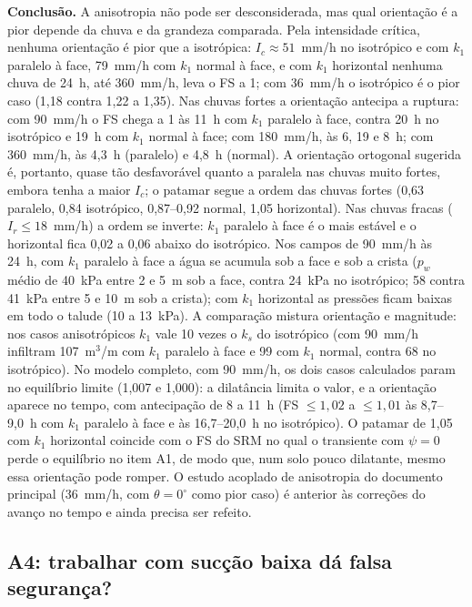 \textbf{Conclus\~ao.} A anisotropia n\~ao pode ser desconsiderada, mas qual orienta\c{c}\~ao \'e a pior depende da chuva
e da grandeza comparada. Pela intensidade cr\'itica, nenhuma orienta\c{c}\~ao \'e pior que a isotr\'opica: $I_c\approx51$~mm/h
no isotr\'opico e com $k_1$ paralelo \`a face, 79~mm/h com $k_1$ normal \`a face, e com $k_1$ horizontal nenhuma chuva de
24~h, at\'e 360~mm/h, leva o FS a 1; com 36~mm/h o isotr\'opico \'e o pior caso (1,18 contra 1,22 a 1,35). Nas chuvas
fortes a orienta\c{c}\~ao antecipa a ruptura: com 90~mm/h o FS chega a 1 \`as 11~h com $k_1$ paralelo \`a face, contra
20~h no isotr\'opico e 19~h com $k_1$ normal \`a face; com 180~mm/h, \`as 6, 19 e 8~h; com 360~mm/h, \`as 4,3~h (paralelo)
e 4,8~h (normal). A orienta\c{c}\~ao ortogonal sugerida \'e, portanto, quase t\~ao desfavor\'avel quanto a paralela nas
chuvas muito fortes, embora tenha a maior $I_c$; o patamar segue a ordem das chuvas fortes (0,63 paralelo, 0,84
isotr\'opico, 0,87--0,92 normal, 1,05 horizontal). Nas chuvas fracas ($I_r\le18$~mm/h) a ordem se inverte: $k_1$
paralelo \`a face \'e o mais est\'avel e o horizontal fica 0,02 a 0,06 abaixo do isotr\'opico. Nos campos de 90~mm/h
\`as 24~h, com $k_1$ paralelo \`a face a \'agua se acumula sob a face e sob a crista ($p_w$ m\'edio de 40~kPa entre 2 e
5~m sob a face, contra 24~kPa no isotr\'opico; 58 contra 41~kPa entre 5 e 10~m sob a crista); com $k_1$ horizontal as
press\~oes ficam baixas em todo o talude (10 a 13~kPa). A compara\c{c}\~ao mistura orienta\c{c}\~ao e magnitude: nos casos
anisotr\'opicos $k_1$ vale 10 vezes o $k_s$ do isotr\'opico (com 90~mm/h infiltram 107~m$^3$/m com $k_1$ paralelo \`a
face e 99 com $k_1$ normal, contra 68 no isotr\'opico). No modelo completo, com 90~mm/h, os dois casos calculados param
no equil\'ibrio limite (1,007 e 1,000): a dilat\^ancia limita o valor, e a orienta\c{c}\~ao aparece no tempo, com
antecipa\c{c}\~ao de 8 a 11~h (FS $\le1{,}02$ a $\le1{,}01$ \`as 8,7--9,0~h com $k_1$ paralelo \`a face e \`as
16,7--20,0~h no isotr\'opico). O patamar de 1,05 com $k_1$ horizontal coincide com o FS do SRM no qual o transiente com
$\psi=0$ perde o equil\'ibrio no item A1, de modo que, num solo pouco dilatante, mesmo essa orienta\c{c}\~ao pode romper.
O estudo acoplado de anisotropia do documento principal (36~mm/h, com $\theta=0^\circ$ como pior caso) \'e anterior \`as
corre\c{c}\~oes do avan\c{c}o no tempo e ainda precisa ser refeito.

\subsection{A4: trabalhar com suc\c{c}\~ao baixa d\'a falsa seguran\c{c}a?}

